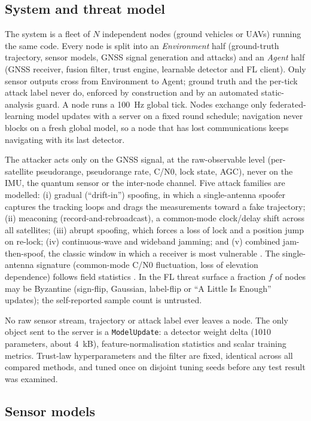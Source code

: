 \documentclass[12pt,a4paper]{article}
\begin{document}
\subsection{System and threat model}
\label{sec:threat}
The system is a fleet of $N$ independent nodes (ground vehicles or UAVs) running the same code. Every node is split into an \emph{Environment} half (ground-truth trajectory, sensor models, GNSS signal generation and attacks) and an \emph{Agent} half (GNSS receiver, fusion filter, trust engine, learnable detector and FL client). Only sensor outputs cross from Environment to Agent; ground truth and the per-tick attack label never do, enforced by construction and by an automated static-analysis guard. A node runs a 100~Hz global tick. Nodes exchange only federated-learning model updates with a server on a fixed round schedule; navigation never blocks on a fresh global model, so a node that has lost communications keeps navigating with its last detector.

The attacker acts only on the GNSS signal, at the raw-observable level (per-satellite pseudorange, pseudorange rate, C/N0, lock state, AGC), never on the IMU, the quantum sensor or the inter-node channel. Five attack families are modelled: (i) gradual (``drift-in'') spoofing, in which a single-antenna spoofer captures the tracking loops and drags the measurements toward a fake trajectory; (ii) meaconing (record-and-rebroadcast), a common-mode clock/delay shift across all satellites; (iii) abrupt spoofing, which forces a loss of lock and a position jump on re-lock; (iv) continuous-wave and wideband jamming; and (v) combined jam-then-spoof, the classic window in which a receiver is most vulnerable \cite{psiaki2016gnss}. The single-antenna signature (common-mode C/N0 fluctuation, loss of elevation dependence) follows field statistics \cite{rados2024recent}. In the FL threat surface a fraction $f$ of nodes may be Byzantine (sign-flip, Gaussian, label-flip or ``A Little Is Enough'' updates); the self-reported sample count is untrusted.

No raw sensor stream, trajectory or attack label ever leaves a node. The only object sent to the server is a \texttt{ModelUpdate}: a detector weight delta (1010 parameters, about 4~kB), feature-normalisation statistics and scalar training metrics. Trust-law hyperparameters and the filter are fixed, identical across all compared methods, and tuned once on disjoint tuning seeds before any test result was examined.

\subsection{Sensor models}
\label{sec:sensors}
\end{document}
